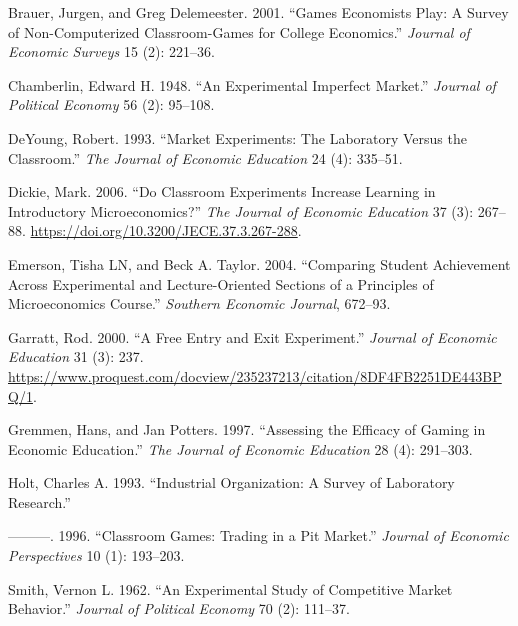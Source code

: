 \documentclass[
]{article}
\newlength{\cslhangindent}
\newlength{\cslentryspacingunit} %
\newenvironment{CSLReferences}[2] %
 {%
  \setlength{\parindent}{0pt}
  \ifodd #1
  \let\oldpar\par
  \def\par{\hangindent=\cslhangindent\oldpar}
  \fi
  \setlength{\parskip}{#2\cslentryspacingunit}
 }%
 {}
\begin{document}
\hypertarget{refs}{}
\begin{CSLReferences}{1}{0}
\leavevmode{}%
Brauer, Jurgen, and Greg Delemeester. 2001. {``Games Economists Play:
{A} Survey of Non-Computerized Classroom-Games for College Economics.''}
\emph{Journal of Economic Surveys} 15 (2): 221--36.

\leavevmode{}%
Chamberlin, Edward H. 1948. {``An Experimental Imperfect Market.''}
\emph{Journal of Political Economy} 56 (2): 95--108.

\leavevmode{}%
DeYoung, Robert. 1993. {``Market Experiments: {The} Laboratory Versus
the Classroom.''} \emph{The Journal of Economic Education} 24 (4):
335--51.

\leavevmode{}%
Dickie, Mark. 2006. {``Do {Classroom} {Experiments} {Increase}
{Learning} in {Introductory} {Microeconomics}?''} \emph{The Journal of
Economic Education} 37 (3): 267--88.
\url{https://doi.org/10.3200/JECE.37.3.267-288}.

\leavevmode{}%
Emerson, Tisha LN, and Beck A. Taylor. 2004. {``Comparing Student
Achievement Across Experimental and Lecture-Oriented Sections of a
Principles of Microeconomics Course.''} \emph{Southern Economic
Journal}, 672--93.

\leavevmode{}%
Garratt, Rod. 2000. {``A Free Entry and Exit Experiment.''}
\emph{Journal of Economic Education} 31 (3): 237.
\url{https://www.proquest.com/docview/235237213/citation/8DF4FB2251DE443BPQ/1}.

\leavevmode{}%
Gremmen, Hans, and Jan Potters. 1997. {``Assessing the Efficacy of
Gaming in Economic Education.''} \emph{The Journal of Economic
Education} 28 (4): 291--303.

\leavevmode{}%
Holt, Charles A. 1993. {``Industrial {Organization}: {A} {Survey} of
{Laboratory} {Research}.''}

\leavevmode{}%
---------. 1996. {``Classroom Games: {Trading} in a Pit Market.''}
\emph{Journal of Economic Perspectives} 10 (1): 193--203.

\leavevmode{}%
Smith, Vernon L. 1962. {``An Experimental Study of Competitive Market
Behavior.''} \emph{Journal of Political Economy} 70 (2): 111--37.


\end{CSLReferences}
\end{document}
